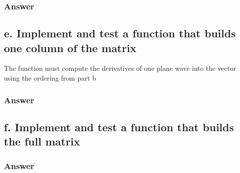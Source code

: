 \documentclass{article}
\begin{document}
	\subsubsection{Answer}
	
	\subsection{e. Implement and test a function that builds one column of the matrix}
	The function must compute the derivatives of one plane wave into the vector using the ordering from part b
	
	\subsubsection{Answer}
	
	\subsection{f. Implement and test a function that builds the full matrix}
	
	\subsubsection{Answer}
	
	
\end{document}
